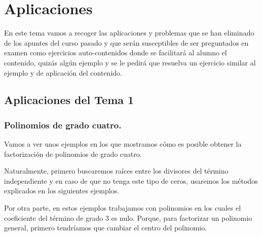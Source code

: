 %
%
\chapter{Aplicaciones}

En este tema vamos a recoger las aplicaciones y problemas que se han eliminado de los apuntes del curso pasado y que serán susceptibles de ser preguntados en examen como ejercicios auto-contenidos donde se facilitará al alumno el contenido, quizás algún ejemplo y se le pedirá que resuelva un ejercicio similar al ejemplo y de aplicación del contenido.


\section{Aplicaciones del Tema 1}

\subsection{Polinomios de grado cuatro.}

Vamos a ver unos ejemplos en los que mostramos cómo es posible obtener la factorización de polinomios de grado cuatro.

Naturalmente, primero buscaremos raíces entre los divisores del término independiente y en caso de que no tenga este tipo de ceros, usaremos los métodos explicados en los siguientes ejemplos.

Por otra parte, en estos ejemplos trabajamos con polinomios en los cuales el coeficiente del término de grado 3 es nulo. Porque, para factorizar un polinomio general, primero tendríamos que cambiar el centro del polinomio.

